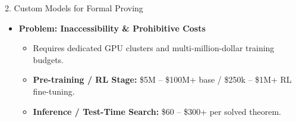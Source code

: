 \documentclass[compress,10pt,xcolor=dvipsnames]{beamer}
\begin{document}
\begin{frame}{2. Custom Models for Formal Proving}
\vspace{-0.4em}
\begin{itemize}
  \item<3-> {\color{red}\textbf{Problem: Inaccessibility \& Prohibitive Costs}}
    \begin{itemize}
      \item Requires dedicated GPU clusters and multi-million-dollar training budgets.
      \item \textbf{Pre-training / RL Stage:} \$5M -- \$100M+ base / \$250k -- \$1M+ RL fine-tuning.
      \item \textbf{Inference / Test-Time Search:} \$60 -- \$300+ per solved theorem.
    \end{itemize}
\end{itemize}
\end{frame}
\end{document}
